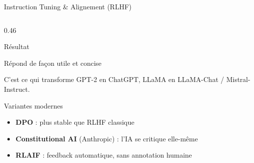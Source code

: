 \documentclass[aspectratio=169, 10pt]{beamer}
\begin{document}
\begin{frame}{Instruction Tuning \& Alignement (RLHF)}
\begin{columns}[T]
\begin{column}{0.46\textwidth}
\begin{exampleblock}{Résultat}
\begin{itemize}
                Répond de façon utile et concise
        \end{itemize}
        \vspace{4pt}
        C'est ce qui transforme GPT-2 en ChatGPT,
        LLaMA en LLaMA-Chat / Mistral-Instruct.
      \end{exampleblock}
      \vspace{4pt}
      \begin{block}{Variantes modernes}
        \begin{itemize}
          \item \textbf{DPO} : plus stable que RLHF classique
          \item \textbf{Constitutional AI} (Anthropic) :
                l'IA se critique elle-même
          \item \textbf{RLAIF} : feedback automatique,
                sans annotation humaine
        \end{itemize}
      \end{block}
    \end{column}
  \end{columns}
\end{frame}
\end{document}
